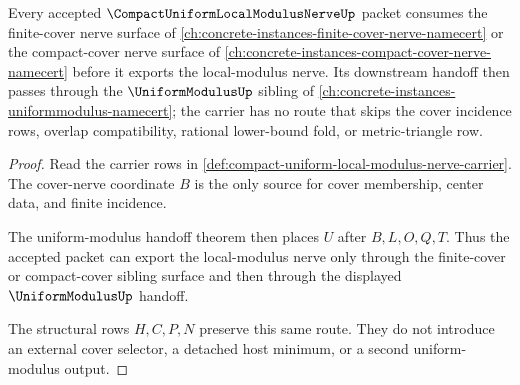 \begin{theorem}
\label{thm:compact-uniform-local-modulus-nerve-sibling-route}
Every accepted $\CompactUniformLocalModulusNerveUp$ packet consumes the finite-cover nerve surface of \autoref{ch:concrete-instances-finite-cover-nerve-namecert} or the compact-cover nerve surface of \autoref{ch:concrete-instances-compact-cover-nerve-namecert} before it exports the local-modulus nerve. Its downstream handoff then passes through the $\UniformModulusUp$ sibling of \autoref{ch:concrete-instances-uniformmodulus-namecert}; the carrier has no route that skips the cover incidence rows, overlap compatibility, rational lower-bound fold, or metric-triangle row.
\end{theorem}
\begin{proof}
Read the carrier rows in \autoref{def:compact-uniform-local-modulus-nerve-carrier}. The cover-nerve coordinate $B$ is the only source for cover membership, center data, and finite incidence.

The uniform-modulus handoff theorem then places $U$ after $B,L,O,Q,T$. Thus the accepted packet can export the local-modulus nerve only through the finite-cover or compact-cover sibling surface and then through the displayed $\UniformModulusUp$ handoff.

The structural rows $H,C,P,N$ preserve this same route. They do not introduce an external cover selector, a detached host minimum, or a second uniform-modulus output.
\end{proof}




